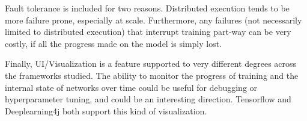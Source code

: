 Fault tolerance is included for two reasons. Distributed execution tends to be more failure prone, especially at scale. Furthermore, any failures (not necessarily limited to distributed execution) that interrupt training part-way can be very costly, if all the progress made on the model is simply lost. 

Finally, UI/Visualization is a feature supported to very different degrees across the frameworks studied. The ability to monitor the progress of training and the internal state of networks over time could be useful for debugging or hyperparameter tuning, and could be an interesting direction. Tensorflow and Deeplearning4j both support this kind of visualization. 
